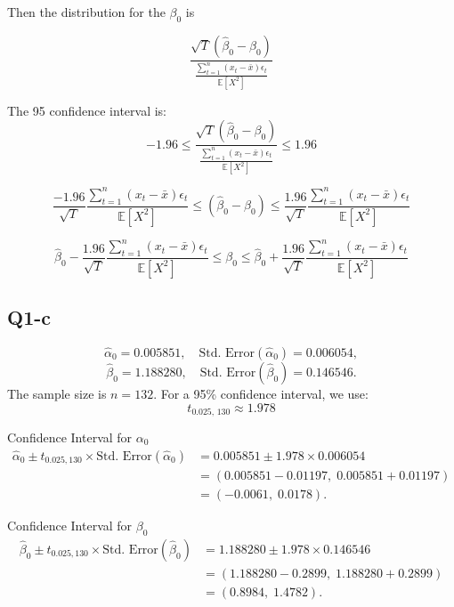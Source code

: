 \documentclass{article} %
\begin{document}
Then the distribution for the $\beta_0$ is


\begin{equation}
 \frac{\sqrt{T}(\hat{\beta}_0 - \beta_0)}{ \frac{\sum_{t=1}^n (x_t - \bar{x})\epsilon_t}{\mathbb{E}[X^2] }}
\end{equation}


The 95 confidence interval is:
\begin{equation}
 -1.96  \leqslant \frac{\sqrt{T}(\hat{\beta}_0 - \beta_0)}{ \frac{\sum_{t=1}^n (x_t - \bar{x})\epsilon_t}{\mathbb{E}[X^2] }} \leqslant 1.96
\end{equation}


\begin{equation}
    \frac{-1.96}{\sqrt{T}} \frac{\sum_{t=1}^n (x_t - \bar{x})\epsilon_t}{\mathbb{E}[X^2] }  \leqslant (\hat{\beta}_0 - \beta_0)  \leqslant  \frac{1.96}{\sqrt{T}} \frac{\sum_{t=1}^n (x_t - \bar{x})\epsilon_t}{\mathbb{E}[X^2] } 
\end{equation}
   
   
\begin{equation}
    \hat{\beta}_0 -\frac{1.96}{\sqrt{T}} \frac{\sum_{t=1}^n (x_t - \bar{x})\epsilon_t}{\mathbb{E}[X^2] }  \leqslant  \beta_0 \leqslant  \hat{\beta}_0 + \frac{1.96}{\sqrt{T}} \frac{\sum_{t=1}^n (x_t - \bar{x})\epsilon_t}{\mathbb{E}[X^2] } 
\end{equation}
   
\subsection{Q1-c}

\[
\hat{\alpha}_0 = 0.005851, \quad \text{Std. Error}(\hat{\alpha}_0) = 0.006054,
\]
\[
\hat{\beta}_0 = 1.188280, \quad \text{Std. Error}(\hat{\beta}_0) = 0.146546.
\]
The sample size is \(n=132\). For a 95\% confidence interval, we use:
\[
t_{0.025,\,130} \approx 1.978 
\]

Confidence Interval for \(\alpha_0\)
\begin{align*}
\hat{\alpha}_0 \pm t_{0.025,130} \times \text{Std. Error}(\hat{\alpha}_0) &= 0.005851 \pm 1.978 \times 0.006054 \\
&= (0.005851 - 0.01197, \; 0.005851 + 0.01197) \\
&= (-0.0061, \; 0.0178).
\end{align*}

Confidence Interval for \(\beta_0\)
\begin{align*}
\hat{\beta}_0 \pm t_{0.025,130} \times \text{Std. Error}(\hat{\beta}_0) &= 1.188280 \pm 1.978 \times 0.146546 \\
&= (1.188280 - 0.2899, \; 1.188280 + 0.2899) \\
&= (0.8984, \; 1.4782).
\end{align*}
\end{document}
